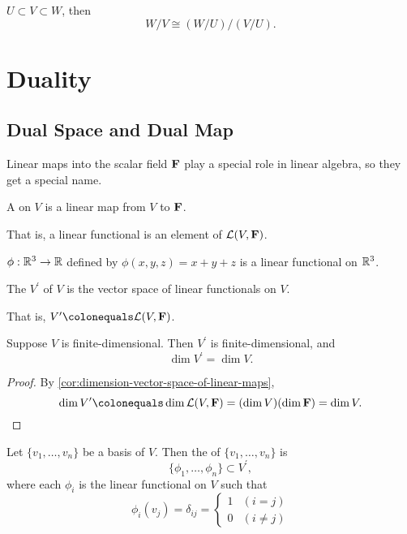 \begin{theorem}
$U\subset V\subset W$, then
\begin{equation}
W/V\cong(W/U)/(V/U).
\end{equation}
\end{theorem}
\pagebreak

\section{Duality}
\subsection{Dual Space and Dual Map}
Linear maps into the scalar field $\mathbf F$ play a special role in linear algebra, so they get a special name.

\begin{definition}
A  on $V$ is a linear map from $V$ to $\mathbf F$.
\end{definition}

That is, a linear functional is an element of $\mathcal{L}(V,\mathbf F)$.

\begin{example}
$\phi:\mathbb R^3\to\mathbb R$ defined by $\phi(x,y,z)=x+y+z$ is a linear functional on $\mathbb R^3$.
\end{example}

\begin{definition}
The  $V^\prime$ of $V$ is the vector space of linear functionals on $V$.
\end{definition}

That is, $V^\prime\colonequals\mathcal{L}(V,\FF)$.

\begin{lemma}\label{lemma:dimension-dual-space}
Suppose $V$ is finite-dimensional. Then $V^\prime$ is finite-dimensional, and
\[\dim V^\prime=\dim V.\]
\end{lemma}

\begin{proof}
By \ref{cor:dimension-vector-space-of-linear-maps},
\[\dim V^\prime\colonequals\dim\mathcal{L}(V,\FF)=(\dim V)(\dim\FF)=\dim V.\]
\end{proof}

\begin{definition}
Let $\{v_1,\dots,v_n\}$ be a basis of $V$. Then the  of $\{v_1,\dots,v_n\}$ is
\[\{\phi_1,\dots,\phi_n\}\subset V^\prime,\]
where each $\phi_i$ is the linear functional on $V$ such that
\[\phi_i(v_j)=\delta_{ij}=\begin{cases}
1&(i=j)\\
0&(i\neq j)
\end{cases}\]
\end{definition}

